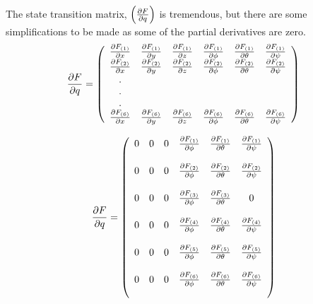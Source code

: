 The state transition matrix, $\left(\frac{\partial F}{\partial q}\right)$  is tremendous, but there are some simplifications to be made as some of the partial derivatives are zero.\\

\begin{equation}
    \frac{\partial F}{\partial q} = \left(
    \begin{array}{c c c c c c}
    \frac{\partial F_{(1)}}{\partial x} & \frac{\partial F_{(1)}}{\partial y} & \frac{\partial F_{(1)}}{\partial z} & \frac{\partial F_{(1)}}{\partial \phi} & \frac{\partial F_{(1)}}{\partial \theta} & \frac{\partial F_{(1)}}{\partial \psi}\\

    \frac{\partial F_{(2)}}{\partial x} & \frac{\partial F_{(2)}}{\partial y} & \frac{\partial F_{(2)}}{\partial z} & \frac{\partial F_{(2)}}{\partial \phi} & \frac{\partial F_{(2)}}{\partial \theta} & \frac{\partial F_{(2)}}{\partial \psi}\\

    .\\
    .\\
    .\\

    \frac{\partial F_{(6)}}{\partial x} & \frac{\partial F_{(6)}}{\partial y} & \frac{\partial F_{(6)}}{\partial z} & \frac{\partial F_{(6)}}{\partial \phi} & \frac{\partial F_{(6)}}{\partial \theta} & \frac{\partial F_{(6)}}{\partial \psi}\\

    \end{array}\right)
\end{equation}


\begin{equation}
    \frac{\partial F}{\partial q} = \left(
    \begin{array}{c c c c c c}
    0 & 0 & 0 & \frac{\partial F_{(1)}}{\partial \phi} & \frac{\partial F_{(1)}}{\partial \theta} & \frac{\partial F_{(1)}}{\partial \psi}\\\\

    0 & 0 & 0 & \frac{\partial F_{(2)}}{\partial \phi} & \frac{\partial F_{(2)}}{\partial \theta} & \frac{\partial F_{(2)}}{\partial \psi}\\\\

    0 & 0 & 0 & \frac{\partial F_{(3)}}{\partial \phi} & \frac{\partial F_{(3)}}{\partial \theta} & 0\\\\

    0 & 0 & 0 & \frac{\partial F_{(4)}}{\partial \phi} & \frac{\partial F_{(4)}}{\partial \theta} & \frac{\partial F_{(4)}}{\partial \psi}\\\\

    0 & 0 & 0 & \frac{\partial F_{(5)}}{\partial \phi} & \frac{\partial F_{(5)}}{\partial \theta} & \frac{\partial F_{(5)}}{\partial \psi}\\\\

    0 & 0 & 0 & \frac{\partial F_{(6)}}{\partial \phi} & \frac{\partial F_{(6)}}{\partial \theta} & \frac{\partial F_{(6)}}{\partial \psi}\\\\

    \end{array}\right)
\end{equation}

